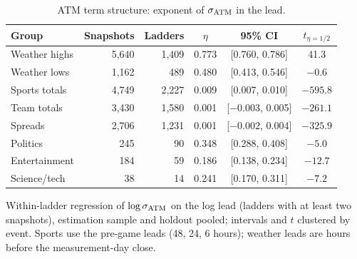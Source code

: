 \begin{table}[ht]
\centering\small
\begin{threeparttable}
\caption{ATM term structure: exponent of $\sigma_{\mathrm{ATM}}$ in the lead.}\label{tab:lad-term}
\begin{tabular}{@{}lrrccc@{}}
\toprule
Group & Snapshots & Ladders & $\eta$ & 95\% CI & $t_{\eta=1/2}$ \\
\midrule
Weather highs & 5,640 & 1,409 & 0.773 & [0.760, 0.786] & 41.3 \\
Weather lows & 1,162 & 489 & 0.480 & [0.413, 0.546] & $-0.6$ \\
Sports totals & 4,749 & 2,227 & 0.009 & [0.007, 0.010] & $-595.8$ \\
Team totals & 3,430 & 1,580 & 0.001 & [$-0.003$, 0.005] & $-261.1$ \\
Spreads & 2,706 & 1,231 & 0.001 & [$-0.002$, 0.004] & $-325.9$ \\
Politics & 245 & 90 & 0.348 & [0.288, 0.408] & $-5.0$ \\
Entertainment & 184 & 59 & 0.186 & [0.138, 0.234] & $-12.7$ \\
Science/tech & 38 & 14 & 0.241 & [0.170, 0.311] & $-7.2$ \\
\bottomrule
\end{tabular}
\begin{tablenotes}[flushleft]\footnotesize
\item Within-ladder regression of $\log\sigma_{\mathrm{ATM}}$ on the log lead (ladders with at least two
snapshots), estimation sample and holdout pooled; intervals and $t$ clustered by event. Sports
use the pre-game leads (48, 24, 6 hours); weather leads are hours before the measurement-day close.
\end{tablenotes}
\end{threeparttable}
\end{table}

